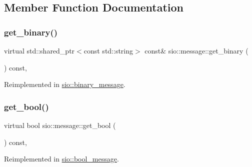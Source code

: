 \subsection{Member Function Documentation}
\mbox{\label{classsio_1_1message_a55b9eeeb305f46bbf21ae339501174c2}} 
\subsubsection{\texorpdfstring{get\+\_\+binary()}{get\_binary()}}
{\footnotesize\ttfamily virtual std\+::shared\+\_\+ptr$<$const std\+::string$>$ const\& sio\+::message\+::get\+\_\+binary (\begin{DoxyParamCaption}{ }\end{DoxyParamCaption}) const\hspace{0.3cm}{\ttfamily [inline]}, {\ttfamily [virtual]}}



Reimplemented in \hyperlink{classsio_1_1binary__message_aac4db910fd9afb507ef0750394c5cd29}{sio\+::binary\+\_\+message}.

\mbox{\label{classsio_1_1message_a3acbec589c3dc214d44dd4db1a6f8a2c}} 
\subsubsection{\texorpdfstring{get\+\_\+bool()}{get\_bool()}}
{\footnotesize\ttfamily virtual bool sio\+::message\+::get\+\_\+bool (\begin{DoxyParamCaption}{ }\end{DoxyParamCaption}) const\hspace{0.3cm}{\ttfamily [inline]}, {\ttfamily [virtual]}}



Reimplemented in \hyperlink{classsio_1_1bool__message_aca66ff64b5ac4198c5292e26abdf9e92}{sio\+::bool\+\_\+message}.

\mbox{\label{classsio_1_1message_aa89963cd233b29653df1ce1943f9ea57}} 
